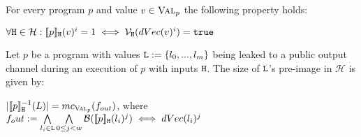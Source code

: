\begin{theorem}
    For every program $p$ and value $v \in \textsc{Val}_p$ the following property holds:
    \begin{center}
        $\forall \mathtt{H} \in \mathcal{H}: \llbracket p \rrbracket_{\mathtt{H}} (v) ^i = 1 \iff \mathcal{V}_{\mathtt{H}}(dVec(v)^i) = \mathtt{true}$
    \end{center}
\end{theorem}

\begin{lemma}
    Let $p$ be a program with values $\mathtt{L} := \{l_0, ..., l_m \}$ being leaked to a public output channel during an execution of $p$ with inputs $\mathtt{H}$.
    The size of $\mathtt{L}$'s pre-image in $\mathcal{H}$ is given by:
    \begin{center}
        $|\llbracket p \rrbracket_{\mathtt{H}}^{-1} (L)| = mc_{\textsc{Val}_p} ( f_{out})$, where \\
        $f_out := \bigwedge\limits_{l_i \in \mathtt{L}} \bigwedge\limits_{0 \leq j < w} \mathcal{B}(\llbracket p \rrbracket_{\mathtt{H}}(l_i)^j) \iff dVec(l_i)^j$
    \end{center}
\end{lemma}

